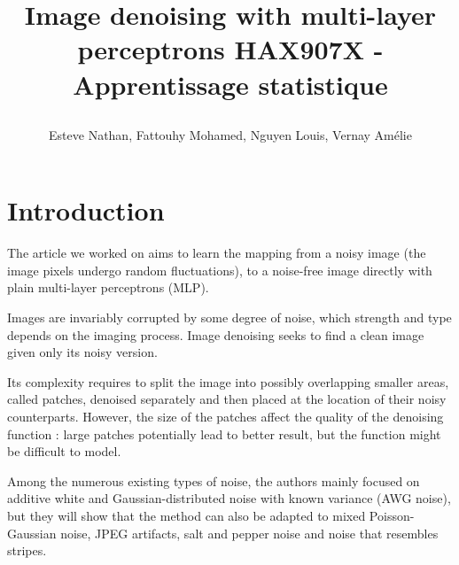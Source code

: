 \documentclass[10pt,a4paper]{article}
\author{Esteve Nathan, Fattouhy Mohamed, Nguyen Louis, Vernay Amélie}
\title{%
    \begin{minipage}\linewidth
        \centering
        Image denoising with multi-layer perceptrons
        \vskip3pt
        \large 
        HAX907X - Apprentissage statistique
    \end{minipage}
}
\newcommand{\svs}{\vspace{9pt}}
\begin{document}
\maketitle
\section{Introduction}

The article we worked on \citep{denoise} aims to learn the mapping from a noisy image (the image pixels undergo random fluctuations), to a noise-free image directly with plain multi-layer perceptrons (MLP).

\svs

Images are invariably corrupted by some degree of noise, which strength and type depends on the imaging process. Image denoising seeks to find a clean image given only its noisy version.

\svs

Its complexity requires to split the image into possibly overlapping smaller areas, called patches, denoised separately and then placed at the location of their noisy counterparts. However, the size of the patches affect the quality of the denoising function : large patches potentially lead to better result, but the function might be difficult to model.

\svs

Among the numerous existing types of noise, the authors mainly focused on additive white and Gaussian-distributed noise with known variance (AWG noise), but they will show that the method can also be adapted to mixed Poisson-Gaussian noise, JPEG artifacts, salt and pepper noise and noise that resembles stripes.

\svs



\end{document}

